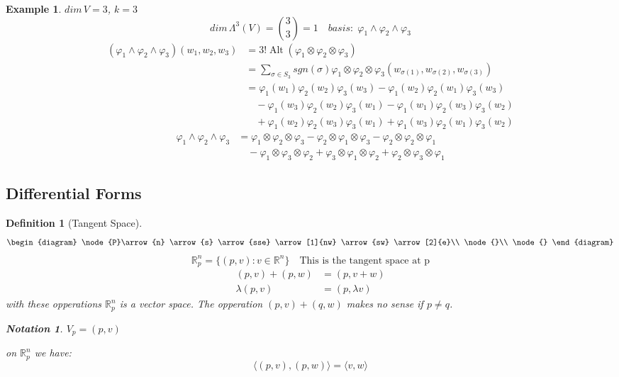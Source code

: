 \documentclass[12pt]{article}
\def\RR{\mathbb{R}}
\DeclareMathOperator{\alt}{Alt}
\newtheorem{definition}{Definition}[section]
\newtheorem{example}{Example}[section]
\newtheorem*{notation}{Notation}
\begin{document}
\begin{example}
$dim\,V = 3$, $k=3$
\[dim\,\Lambda^3(V) = {3 \choose 3} = 1\quad basis:\; \varphi_1\wedge\varphi_2\wedge\varphi_3\]
\begin{align*}
(\varphi_1\wedge\varphi_2\wedge\varphi_3)(w_1,w_2,w_3) &= 3!\alt(\varphi_1\otimes\varphi_2\otimes\varphi_3)\\
&=\sum\limits_{\sigma \in S_3}sgn(\sigma)\varphi_1\otimes\varphi_2\otimes\varphi_3(w_{\sigma(1)}, w_{\sigma(2)}, w_{\sigma(3)})\\ 
&=\varphi_1(w_1)\varphi_2(w_2)\varphi_3(w_3) - \varphi_1(w_2)\varphi_2(w_1)\varphi_3(w_3)\\ & \quad - \varphi_1(w_3)\varphi_2(w_2)\varphi_3(w_1) - \varphi_1(w_1)\varphi_2(w_3)\varphi_3(w_2) \\ & \quad + \varphi_1(w_2)\varphi_2(w_3)\varphi_3(w_1) + \varphi_1(w_3)\varphi_2(w_1)\varphi_3(w_2)
\end{align*}
\begin{align*}
\varphi_1\wedge\varphi_2\wedge\varphi_3 &= \varphi_1\otimes\varphi_2\otimes\varphi_3 - \varphi_2\otimes\varphi_1\otimes\varphi_3 - \varphi_2\otimes\varphi_2\otimes\varphi_1\\ & \quad- \varphi_1\otimes\varphi_3\otimes\varphi_2 + \varphi_3\otimes\varphi_1\otimes\varphi_2 + \varphi_2\otimes\varphi_3\otimes\varphi_1
\end{align*}
\end{example}

\subsection{Differential Forms}

\begin{definition}[Tangent Space]\quad \\
\[\begin{diagram}
\node{P}\arrow{n} \arrow{s} \arrow{sse} \arrow[1]{nw} \arrow{sw} \arrow[2]{e}\\
\node{}\\
\node{}
\end{diagram} \]
\[\RR_p^n = \{(p,v) : v \in \RR^n\} \quad \text{This is the tangent space at p}\]
\begin{align*}
(p,v) + (p,w) &= (p,v+w)\\
\lambda(p,v) &= (p,\lambda v) 
\end{align*}
with these opperations $\RR_p^n$ is a vector space.
The opperation $(p,v) + (q,w)$ makes no sense if $p \neq q$. 
\begin{notation} $V_p = (p,v)$ \end{notation}
on $\RR_p^n$ we have:
\[ \langle (p,v), (p,w)\rangle = \langle v,w \rangle \]
\end{definition}
\end{document}
